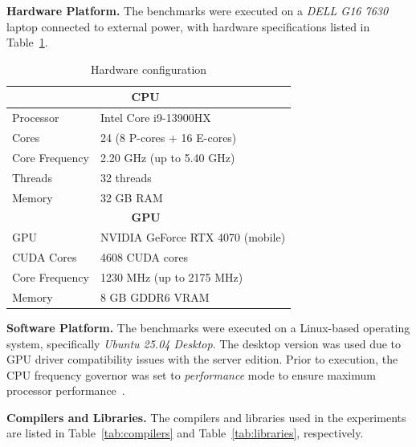 \documentclass[sigconf]{acmart}
\newcommand{\mypar}[1]{{\bf #1.}}
\begin{document}
\mypar{Hardware Platform}
The benchmarks were executed on a \textit{DELL G16 7630} laptop connected to external power,
with hardware specifications listed in Table~\ref{tab:hardware-config}.

\begin{table}[H]
      \centering
      \caption{Hardware configuration}\label{tab:hardware-config}
      \begin{tabular}{|l|l|}
            \hline
            \multicolumn{2}{|c|}{\textbf{CPU}~\cite{cpu_specs}} \\
            \hline
            Processor      & Intel Core i9-13900HX              \\
            Cores          & 24 (8 P-cores + 16 E-cores)        \\
            Core Frequency & 2.20 GHz (up to 5.40 GHz)          \\
            Threads        & 32 threads                         \\
            Memory         & 32 GB RAM                          \\
            \hline
            \hline
            \multicolumn{2}{|c|}{\textbf{GPU}~\cite{gpu_specs}} \\
            \hline
            GPU            & NVIDIA GeForce RTX 4070 (mobile)   \\
            CUDA Cores     & 4608 CUDA cores                    \\
            Core Frequency & 1230 MHz (up to 2175 MHz)          \\
            Memory         & 8 GB GDDR6 VRAM                    \\
            \hline
      \end{tabular}
\end{table}

\mypar{Software Platform}
The benchmarks were executed on a Linux-based operating system, specifically \textit{Ubuntu 25.04 Desktop}.
The desktop version was used due to GPU driver compatibility issues with the server edition. Prior to execution,
the CPU frequency governor was set to \textit{performance} mode to ensure maximum processor performance~\cite{google_benchmark:governor}.

\mypar{Compilers and Libraries}
The compilers and libraries used in the experiments are listed in Table~\ref{tab:compilers} and Table~\ref{tab:libraries}, respectively.
\end{document}
